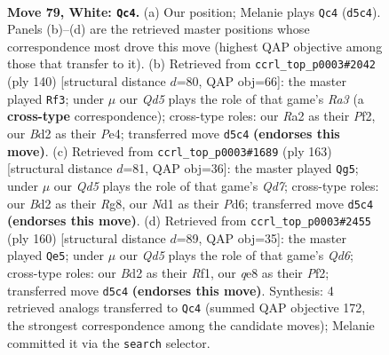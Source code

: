 \documentclass[11pt]{article}
\begin{document}
\clearpage

\begin{figure}[p]\centering
\begin{subfigure}{0.46\textwidth}\centering
\resizebox{\linewidth}{!}{%
\newchessgame
\chessboard[
  setfen={1r2q3/6k1/5b2/P1pQ1p2/3pnPp1/4P3/R2B4/3NK3 w - - 1 79},
  showmover=false,
  pgfstyle=straightmove, color=movearrow, markmove={d5-c4}
]}
\caption{}
\end{subfigure}\hfill
\begin{subfigure}{0.46\textwidth}\centering
\resizebox{\linewidth}{!}{%
\newchessgame
\chessboard[
  setfen={5r1k/4q3/1pQp3P/b1nPpBp1/4P1N1/R7/5PK1/8 w - - 9 71},
  showmover=false,
  pgfstyle=straightmove, color=movearrow, markmove={a3-f3}
]}
\caption{}
\end{subfigure}
\\[4pt]
\begin{subfigure}{0.46\textwidth}\centering
\resizebox{\linewidth}{!}{%
\newchessgame
\chessboard[
  setfen={6rk/6p1/3p2Pp/3Nb3/P7/K1P2Q2/1P1q4/5R2 b - - 8 82},
  showmover=false,
  pgfstyle=straightmove, color=movearrow, markmove={d2-g5}
]}
\caption{}
\end{subfigure}\hfill
\begin{subfigure}{0.46\textwidth}\centering
\resizebox{\linewidth}{!}{%
\newchessgame
\chessboard[
  setfen={6k1/1pr1q3/2pQn1p1/P2p4/6Pp/4P2P/5PB1/5RK1 w - - 2 81},
  showmover=false,
  pgfstyle=straightmove, color=movearrow, markmove={d6-e5}
]}
\caption{}
\end{subfigure}
\caption{\textbf{Move 79, White: \texttt{Qc4}.} (a) Our position; Melanie plays \texttt{Qc4} (\texttt{d5c4}). Panels (b)--(d) are the retrieved master positions whose correspondence most drove this move (highest QAP objective among those that transfer to it). (b) Retrieved from \texttt{ccrl\_top\_p0003\#2042} (ply 140) [structural distance $d$=80, QAP obj=66]: the master played \texttt{Rf3}; under $\mu$ our \emph{Qd5} plays the role of that game's \emph{Ra3} (a \textbf{cross-type} correspondence); cross-type roles: our \emph{R}a2 as their \emph{P}f2, our \emph{B}d2 as their \emph{P}e4; transferred move \texttt{d5c4} \textbf{(endorses this move)}. (c) Retrieved from \texttt{ccrl\_top\_p0003\#1689} (ply 163) [structural distance $d$=81, QAP obj=36]: the master played \texttt{Qg5}; under $\mu$ our \emph{Qd5} plays the role of that game's \emph{Qd7}; cross-type roles: our \emph{B}d2 as their \emph{R}g8, our \emph{N}d1 as their \emph{P}d6; transferred move \texttt{d5c4} \textbf{(endorses this move)}. (d) Retrieved from \texttt{ccrl\_top\_p0003\#2455} (ply 160) [structural distance $d$=89, QAP obj=35]: the master played \texttt{Qe5}; under $\mu$ our \emph{Qd5} plays the role of that game's \emph{Qd6}; cross-type roles: our \emph{B}d2 as their \emph{R}f1, our \emph{q}e8 as their \emph{P}f2; transferred move \texttt{d5c4} \textbf{(endorses this move)}. Synthesis: 4 retrieved analogs transferred to \texttt{Qc4} (summed QAP objective 172, the strongest correspondence among the candidate moves); Melanie committed it via the \texttt{search} selector.}
\label{fig:thought-m156}
\end{figure}
\end{document}

